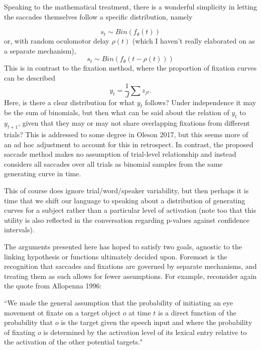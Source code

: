 \documentclass{article}
\begin{document}
Speaking to the mathematical treatment, there is a wonderful simplicity in letting the saccades themselves follow a specific distribution, namely

\begin{equation} \label{eq:saccade_dist}
s_t \sim Bin(f_{\theta}(t))
\end{equation}
or, with random oculomotor delay $\rho(t)$ (which I haven't really elaborated on as a separate mechanism), 
\begin{equation} \label{eq:saccade_dist_rho}
s_t \sim Bin(f_{\theta}(t-\rho(t)))
\end{equation}
This is in contrast to the fixation method, where the proportion of fixation curves can be described
\begin{equation} \label{eq:single_fix_measure}
y_t = \frac{1}{J} \sum z_{jt}.
\end{equation}
Here, is there a clear distribution for what $y_t$ follows? Under independence it may be the sum of binomials, but then what can be said about the relation of $y_t$ to $y_{t+1}$, given that they may or may not share overlapping fixations from different trials? This is addressed to some degree in Oleson 2017, but this seems more of an ad hoc adjustment to account for this in retrospect. In contrast, the proposed saccade method makes no assumption of trial-level relationship and instead considers all saccades over all trials as binomial samples from the same generating curve in time.

This of course does ignore trial/word/speaker variability, but then perhaps it is time that we shift our language to speaking about a distribution of generating curves for a subject rather than a particular level of activation (note too that this utility is also reflected in the conversation regarding p-values against confidence intervals). 

The arguments presented here has hoped to satisfy two goals, agnostic to the linking hypothesis or functions ultimately decided upon. Foremost is the recognition that saccades and fixations are governed by separate mechanisms, and treating them as such allows for fewer assumptions. For example, reconsider again the quote from Allopenna 1996:

 ``We made the general assumption that the probability of initiating an eye movement ot fixate on a target object $o$ at time $t$ is a direct function of the probability that $o$ is the target given the speech input and where the probability of fixating $o$ is determined by the activation level of its lexical entry relative to the activation of the other potential targets."
 
\end{document}
